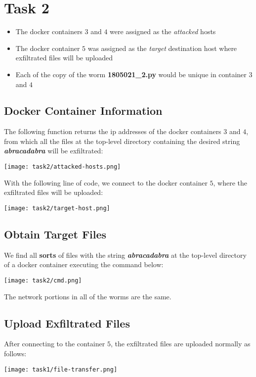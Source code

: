 \documentclass{article}
\begin{document}
\vspace{2cm}
 \section{Task 2}
 \begin{itemize}
     \item The docker containers $3$ and $4$ were assigned as the \textit{attacked} hosts
     \item The docker container $5$ was assigned as the \textit{target} destination host where exfiltrated files will be uploaded
     \item Each of the copy of the worm \textbf{1805021\_2.py} would be unique in container $3$ and $4$
 \end{itemize}

 \subsection{Docker Container Information}
 The following function returns the ip addresses of the docker containers $3$ and $4$, from which all the files at the top-level directory containing the desired string \textbf{\textit{abracadabra}} will be exfiltrated:
\begin{center}
    \texttt{[image: task2/attacked-hosts.png]}
\end{center}

With the following line of code, we connect to the docker container $5$, where the exfiltrated files will be uploaded:
\begin{center}
    \texttt{[image: task2/target-host.png]}
\end{center}


 \subsection{Obtain Target Files}
We find all \textbf{sorts} of files with the string \textbf{\textit{abracadabra}} at the top-level directory of a docker container executing the command below:
\begin{center}
    \texttt{[image: task2/cmd.png]}
\end{center}

The network portions in all of the worms are the same.


\subsection{Upload Exfiltrated Files}
After connecting to the container $5$, the exfiltrated files are uploaded normally as follows: 
\begin{center}
    \texttt{[image: task1/file-transfer.png]}
\end{center}
\end{document}
